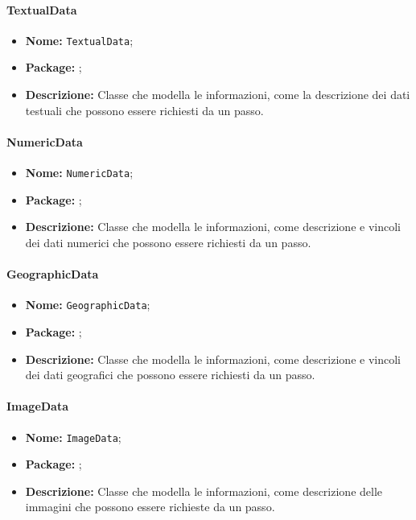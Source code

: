 \paragraph{TextualData}
\begin{itemize}
\item \textbf{Nome:} \texttt{TextualData};
\item \textbf{Package:} \texttt{\smodel{}};
\item \textbf{Descrizione:} Classe che modella le informazioni, come la descrizione dei dati testuali che possono essere richiesti da un passo.
\end{itemize}

\paragraph{NumericData}
\begin{itemize}
\item \textbf{Nome:} \texttt{NumericData};
\item \textbf{Package:} \texttt{\smodel{}};
\item \textbf{Descrizione:} Classe che modella le informazioni, come descrizione e vincoli dei dati numerici che possono essere richiesti da un passo.
\end{itemize}

\paragraph{GeographicData}
\begin{itemize}
\item \textbf{Nome:} \texttt{GeographicData};
\item \textbf{Package:} \texttt{\smodel{}};
\item \textbf{Descrizione:} Classe che modella le informazioni, come descrizione e vincoli dei dati geografici che possono essere richiesti da un passo.
\end{itemize}

\paragraph{ImageData}
\begin{itemize}
\item \textbf{Nome:} \texttt{ImageData};
\item \textbf{Package:} \texttt{\smodel{}};
\item \textbf{Descrizione:} Classe che modella le informazioni, come descrizione delle immagini che possono essere richieste da un passo.
\end{itemize}

